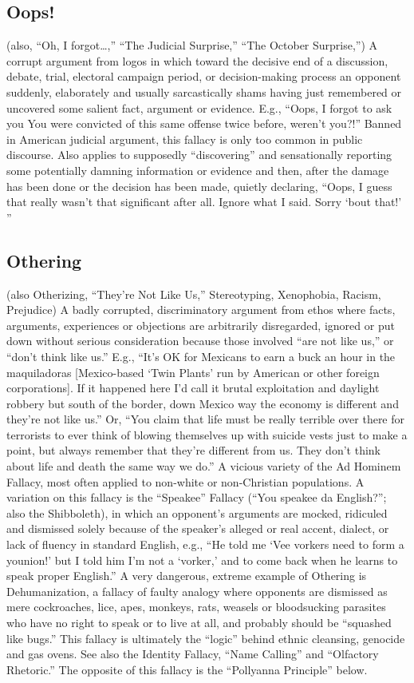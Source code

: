 \documentclass[10pt,a4paper,british]{article}
\begin{document}
\begin{multicols}{2}
	\subsection{Oops!} (also, ``Oh, I forgot\ldots,'' ``The Judicial Surprise,'' ``The October Surprise,'') A corrupt argument from logos in which toward the decisive end of a discussion, debate, trial, electoral campaign period, or decision{-}making process an opponent suddenly, elaborately and usually sarcastically shams having just remembered or uncovered some salient fact, argument or evidence.  E.g., ``Oops, I forgot to ask you  You were convicted of this same offense twice before, weren't you?!'' Banned in American judicial argument, this fallacy is only too common in public discourse. Also applies to supposedly ``discovering'' and sensationally reporting some potentially damning information or evidence and then, after the damage has been done or the decision has been made, quietly declaring, ``Oops, I guess that really wasn't that significant after all. Ignore what I said. Sorry `bout that!' '' 

    \subsection{Othering} (also Otherizing, ``They're Not Like Us,'' Stereotyping, Xenophobia, Racism, Prejudice) A badly corrupted, discriminatory argument from ethos where facts, arguments, experiences or objections are arbitrarily disregarded, ignored or put down without serious consideration because those involved ``are not like us,'' or ``don't think like us.'' E.g., ``It's OK for Mexicans to earn a buck an hour in the maquiladoras [Mexico{-}based `Twin Plants' run by American or other foreign corporations]. If it happened here I'd call it brutal exploitation and daylight robbery but south of the border, down Mexico way the economy is different and they're not like us.''  Or, ``You claim that life must be really terrible over there for terrorists to ever think of blowing themselves up with suicide vests just to make a point, but always remember that they're different from us. They don't think about life and death the same way we do.'' A vicious variety of the Ad Hominem Fallacy, most often applied to non{-}white or non{-}Christian populations. A variation on this fallacy is the ``Speakee'' Fallacy (``You speakee da English?''; also the Shibboleth), in which an opponent's arguments are mocked, ridiculed and dismissed solely because of the speaker's alleged or real accent, dialect, or lack of fluency in standard English, e.g., ``He told me `Vee vorkers need to form a younion!' but I told him I'm not a `vorker,' and to come back when he learns to speak proper English.'' A very dangerous, extreme example of Othering is Dehumanization, a fallacy of faulty analogy where opponents are dismissed as mere cockroaches, lice, apes, monkeys, rats, weasels or bloodsucking parasites who have no right to speak or to live at all, and probably should be ``squashed like bugs.'' This fallacy is ultimately the ``logic'' behind ethnic cleansing, genocide and gas ovens.  See also the Identity Fallacy, ``Name Calling'' and ``Olfactory Rhetoric.'' The opposite of this fallacy is the ``Pollyanna Principle'' below.  


\end{multicols}
\end{document}
